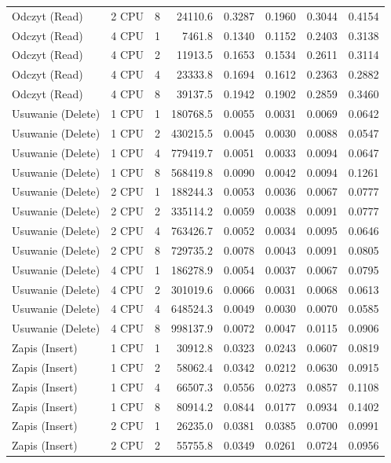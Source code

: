 \begin{table}[ht]
{\begin{tabular}{llcrrrrr}
Odczyt (Read) & 2 CPU & 8 & 24110.6 & 0.3287 & 0.1960 & 0.3044 & 0.4154 \\
Odczyt (Read) & 4 CPU & 1 & 7461.8 & 0.1340 & 0.1152 & 0.2403 & 0.3138 \\
Odczyt (Read) & 4 CPU & 2 & 11913.5 & 0.1653 & 0.1534 & 0.2611 & 0.3114 \\
Odczyt (Read) & 4 CPU & 4 & 23333.8 & 0.1694 & 0.1612 & 0.2363 & 0.2882 \\
Odczyt (Read) & 4 CPU & 8 & 39137.5 & 0.1942 & 0.1902 & 0.2859 & 0.3460 \\
Usuwanie (Delete) & 1 CPU & 1 & 180768.5 & 0.0055 & 0.0031 & 0.0069 & 0.0642 \\
Usuwanie (Delete) & 1 CPU & 2 & 430215.5 & 0.0045 & 0.0030 & 0.0088 & 0.0547 \\
Usuwanie (Delete) & 1 CPU & 4 & 779419.7 & 0.0051 & 0.0033 & 0.0094 & 0.0647 \\
Usuwanie (Delete) & 1 CPU & 8 & 568419.8 & 0.0090 & 0.0042 & 0.0094 & 0.1261 \\
Usuwanie (Delete) & 2 CPU & 1 & 188244.3 & 0.0053 & 0.0036 & 0.0067 & 0.0777 \\
Usuwanie (Delete) & 2 CPU & 2 & 335114.2 & 0.0059 & 0.0038 & 0.0091 & 0.0777 \\
Usuwanie (Delete) & 2 CPU & 4 & 763426.7 & 0.0052 & 0.0034 & 0.0095 & 0.0646 \\
Usuwanie (Delete) & 2 CPU & 8 & 729735.2 & 0.0078 & 0.0043 & 0.0091 & 0.0805 \\
Usuwanie (Delete) & 4 CPU & 1 & 186278.9 & 0.0054 & 0.0037 & 0.0067 & 0.0795 \\
Usuwanie (Delete) & 4 CPU & 2 & 301019.6 & 0.0066 & 0.0031 & 0.0068 & 0.0613 \\
Usuwanie (Delete) & 4 CPU & 4 & 648524.3 & 0.0049 & 0.0030 & 0.0070 & 0.0585 \\
Usuwanie (Delete) & 4 CPU & 8 & 998137.9 & 0.0072 & 0.0047 & 0.0115 & 0.0906 \\
Zapis (Insert) & 1 CPU & 1 & 30912.8 & 0.0323 & 0.0243 & 0.0607 & 0.0819 \\
Zapis (Insert) & 1 CPU & 2 & 58062.4 & 0.0342 & 0.0212 & 0.0630 & 0.0915 \\
Zapis (Insert) & 1 CPU & 4 & 66507.3 & 0.0556 & 0.0273 & 0.0857 & 0.1108 \\
Zapis (Insert) & 1 CPU & 8 & 80914.2 & 0.0844 & 0.0177 & 0.0934 & 0.1402 \\
Zapis (Insert) & 2 CPU & 1 & 26235.0 & 0.0381 & 0.0385 & 0.0700 & 0.0991 \\
Zapis (Insert) & 2 CPU & 2 & 55755.8 & 0.0349 & 0.0261 & 0.0724 & 0.0956 \\

\end{tabular}}
\end{table}
